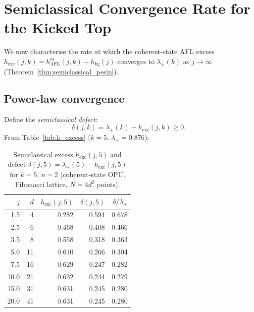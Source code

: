 \documentclass[12pt,a4paper]{article}
\begin{document}
\section{Semiclassical Convergence Rate for the Kicked Top}
\label{sec:convergence_rate}

We now characterise the rate at which the coherent-state AFL excess
$h_{\mathrm{exc}}(j,k) = h_{\mathrm{AFL}}^{\mathrm{cs}}(j,k) - h_{\mathrm{bg}}(j)$
converges to $\lambda_+(k)$ as $j\to\infty$ (Theorem~\ref{thm:semiclassical_pesin}).

\subsection{Power-law convergence}

Define the \emph{semiclassical defect}:
\[
  \delta(j,k) = \lambda_+(k) - h_{\mathrm{exc}}(j,k) \geq 0.
\]
From Table~\ref{tab:h_excess} ($k=5$, $\lambda_+ = 0.876$):

\begin{table}[h!]
\centering
\caption{Semiclassical excess $h_{\mathrm{exc}}(j,5)$ and defect
$\delta(j,5) = \lambda_+(5) - h_{\mathrm{exc}}(j,5)$ for $k=5$, $n=2$
(coherent-state OPU, Fibonacci lattice, $N=4d^2$ points).}
\label{tab:convergence_rate}
\begin{tabular}{r|rr|rr}
\hline
$j$ & $d$ & $h_{\mathrm{exc}}(j,5)$ & $\delta(j,5)$ & $\delta/\lambda_+$ \\
\hline
1.5  &  4  & 0.282 & 0.594 & 0.678 \\
2.5  &  6  & 0.468 & 0.408 & 0.466 \\
3.5  &  8  & 0.558 & 0.318 & 0.363 \\
5.0  & 11  & 0.610 & 0.266 & 0.304 \\
7.5  & 16  & 0.629 & 0.247 & 0.282 \\
10.0 & 21  & 0.632 & 0.244 & 0.279 \\
15.0 & 31  & 0.631 & 0.245 & 0.280 \\
20.0 & 41  & 0.631 & 0.245 & 0.280 \\
\hline
\end{tabular}
\end{table}
\end{document}
